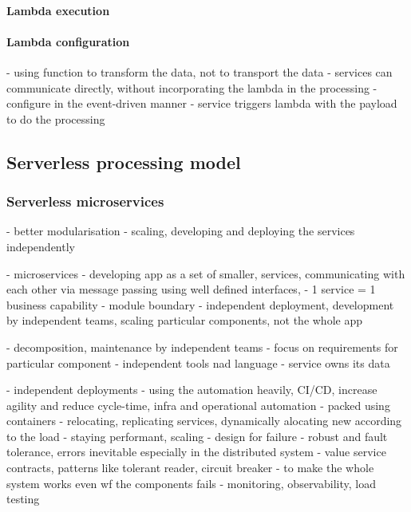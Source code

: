 \paragraph{Lambda execution}

\paragraph{Lambda configuration}

\label{chapter:serverless-suitability-operation-types}
- using function to transform the data, not to transport the data - services can communicate directly, without incorporating the lambda in the processing
- configure in the event-driven manner - service triggers lambda with the payload to do the processing

\subsection{Serverless processing model}

\subsubsection{Serverless microservices}

\label{section:web-apps-microservices}
- better modularisation 
- scaling, developing and deploying the services independently

- microservices - developing app as a set of smaller, services, communicating with each other via message passing using well defined interfaces, 
- 1 service = 1 business capability - module boundary
- independent deployment, development by independent teams, scaling particular components, not the whole app

- decomposition, maintenance by independent teams - focus on requirements for particular component - independent tools nad language
- service owns its data

- independent deployments - using the automation heavily, CI/CD, increase agility and reduce cycle-time, infra and operational automation
- packed using containers - relocating, replicating services, dynamically alocating new according to the load - staying performant, scaling
- design for failure - robust and fault tolerance, errors inevitable especially in the distributed system - value service contracts, patterns like tolerant reader, circuit breaker - to make the whole system works even wf the components fails
- monitoring, observability, load testing

